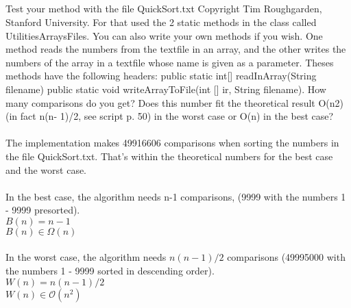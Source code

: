 \documentclass{article}
\begin{document}
\subsection{}
Test your method with the file QuickSort.txt Copyright Tim Roughgarden, Stanford
University.
For that used the 2 static methods in the class called UtilitiesArraysFiles. You can also write
your own methods if you wish. One method reads the numbers from the textfile in an array, and the
other writes the numbers of the array in a textfile whose name is given as a parameter. Theses
methods have the following headers:
public static int[] readInArray(String filename)
public static void writeArrayToFile(int [] ir, String filename).
How many comparisons do you get? Does this number fit the theoretical result O(n2) (in fact n(n-
1)/2, see script p. 50) in the worst case or O(n) in the best case? \\\\
The implementation makes 49916606 comparisons when sorting the numbers in the file
QuickSort.txt. That's within the theoretical numbers for the best case 
and the worst case. \\\\
In the best case, the algorithm needs n-1 comparisons, (9999 with the numbers 1 - 9999 presorted).\\
$B(n) = n - 1$ \\
$B(n) \in \Omega(n)$ \\\\
In the worst case, the algorithm needs $n(n-1)/2$ comparisons (49995000 with the numbers 1 - 9999 sorted
in descending order). \\
$W(n) = n(n - 1) / 2$ \\
$W(n) \in  \mathcal{O}(n^2)$ \\
\end{document}

